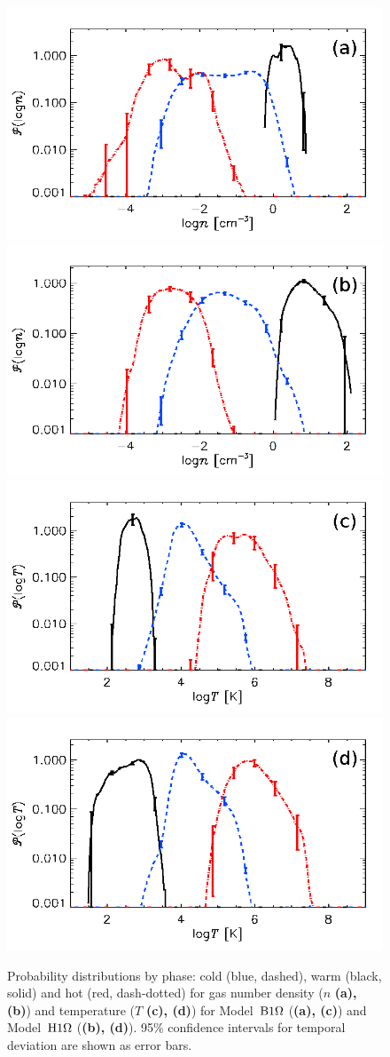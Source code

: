   \begin{figure}[h]
  \centering
  \includegraphics[width=0.45\linewidth]{fig/o1pr_npdf3s.png}  
  \includegraphics[width=0.45\linewidth]{fig/o1ph_npdf3s.png}\\  
  \includegraphics[width=0.45\linewidth]{fig/o1pr_tpdf3s.png}
  \includegraphics[width=0.45\linewidth]{fig/o1ph_tpdf3s.png}  
    \caption[Probability distributions by phase for $n$ and $T$]{
  Probability distributions by phase: cold (blue, dashed), warm (black, solid)
  and hot (red, dash-dotted) for gas number density ($n$ {\textbf{(a), (b)}})
  and temperature ($T$ {\textbf{(c), (d)}}) 
  for Model~${\mathrm{B}1\rm{\Omega} }$ ({\textbf{(a), (c)}}) and Model~${\mathrm{H}1\rm{\Omega}}$
  ({\textbf{(b), (d)}}).
  95\% confidence intervals for temporal deviation are shown as error bars.   
  \label{fig:npdf3s}
    }
  \end{figure}

